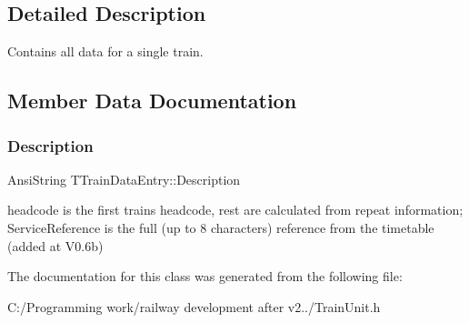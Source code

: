 \subsection{Detailed Description}
Contains all data for a single train. 

\subsection{Member Data Documentation}
\mbox{\label{class_t_train_data_entry_aea5870826c3c6815472e86d82b0c9fe7}} 
\subsubsection{\texorpdfstring{Description}{Description}}
{\footnotesize\ttfamily Ansi\+String T\+Train\+Data\+Entry\+::\+Description}

headcode is the first train\textquotesingle{}s headcode, rest are calculated from repeat information; Service\+Reference is the full (up to 8 characters) reference from the timetable (added at V0.\+6b) 

The documentation for this class was generated from the following file\+:\begin{DoxyCompactItemize}
\item 
C\+:/\+Programming work/railway development after v2../Train\+Unit.\+h\end{DoxyCompactItemize}
